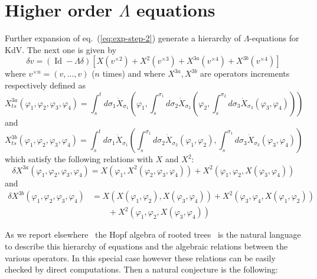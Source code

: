 \documentclass[a4paper,11pt,reqno]{article}
\newcommand{\der}{\delta}
\DeclareMathOperator{\id}{\text{Id}}
\begin{document}
\section{Higher order $\Lambda$ equations}
\label{sec:more}
Further expansion of eq.~(\ref{eq:exp-step-2}) generate a hierarchy of
$\Lambda$-equations for KdV. The next one is given by
\begin{equation}
  \label{eq:hier-next}
  \der v = (\id-\Lambda\der) [X(v^{\times 2}) + X^2 (v^{\times 3}) + X^{3a}(v^{\times 4}) + X^{3b}(v^{\times 4})]
\end{equation}
where $v^{\times n} = (v,\dots,v)$ ($n$ times) and where $X^{3a},X^{3b}$ are operators increments respectively defined as
\begin{equation}
  \label{eq:X3a}
  X^{3a}_{ts}(\varphi_1,\varphi_2,\varphi_3,\varphi_4) = \int_s^t
  d\sigma_1 \dot
  X_{\sigma_1}(\varphi_1,\int_s^{\sigma_1}d\sigma_2 \dot X_{\sigma_2}(\varphi_2,
\int_s^{\sigma_2}d\sigma_3 \dot X_{\sigma_3}(\varphi_3,\varphi_4)))
\end{equation}
and
\begin{equation}
  \label{eq:X3b}
  X^{3b}_{ts}(\varphi_1,\varphi_2,\varphi_3,\varphi_4) = \int_s^t
  d\sigma_1 \dot
  X_{\sigma_1}(\int_s^{\sigma_1}d\sigma_2 \dot
  X_{\sigma_2}(\varphi_1,\varphi_2),
\int_s^{\sigma_1}d\sigma_3 \dot
  X_{\sigma_3}(\varphi_3,\varphi_4))
\end{equation}
which satisfy the following relations with $X$ and $X^2$:
\begin{equation}
  \label{eq:deltaX3a}
  \der X^{3a}(\varphi_1,\varphi_2,\varphi_3,\varphi_4) =
  X(\varphi_1,X^2(\varphi_2,\varphi_3,\varphi_4)) + X^2(\varphi_1,\varphi_2,X(\varphi_3,\varphi_4))
\end{equation}
and
\begin{equation}
  \label{eq:deltaX3b}
  \begin{split}
  \der X^{3b}(\varphi_1,\varphi_2,\varphi_3,\varphi_4) & =
  X(X(\varphi_1,\varphi_2),X(\varphi_3,\varphi_4)) +
  X^2(\varphi_3,\varphi_4,X(\varphi_1,\varphi_2))
\\ & \qquad  + X^2(\varphi_1,\varphi_2,X(\varphi_3,\varphi_4))    
  \end{split}
\end{equation}

As we report elsewhere~\cite{trees}  the Hopf algebra of rooted trees~\cite{MR1905177,MR1909461} is
the natural language to describe this hierarchy of equations and the
algebraic relations between the various operators. In this special
case however these relations can be easily checked by direct 
 computations. Then a natural conjecture
is the following:
\end{document}
